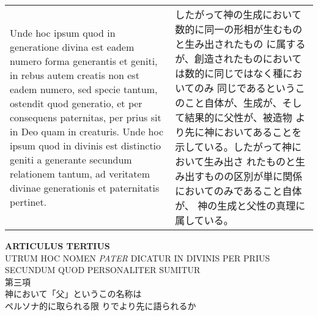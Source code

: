 \documentclass[10pt]{jsarticle} %
\begin{document}
\begin{longtable}{p{21em}p{21em}}
\\

Unde hoc ipsum quod in
generatione divina est eadem numero forma generantis et geniti, in
rebus autem creatis non est eadem numero, sed specie tantum, ostendit
quod generatio, et per consequens paternitas, per prius sit in Deo
quam in creaturis. Unde hoc ipsum quod in divinis est distinctio
geniti a generante secundum relationem tantum, ad veritatem divinae
generationis et paternitatis pertinet.

&

したがって神の生成において数的に同一の形相が生むものと生み出されたもの
 に属するが、創造されたものにおいては数的に同じではなく種においてのみ
 同じであるというこのこと自体が、生成が、そして結果的に父性が、被造物
 より先に神においてあることを示している。したがって神において生み出さ
 れたものと生み出すものの区別が単に関係においてのみであること自体が、
 神の生成と父性の真理に属している。


\end{longtable}
\newpage


\begin{center}
{\Large {\bf ARTICULUS TERTIUS}}\\
{\large UTRUM HOC NOMEN {\itshape PATER} DICATUR IN DIVINIS PER
 PRIUS\\SECUNDUM QUOD PERSONALITER SUMITUR}\\
{\Large 第三項 \\神において「父」というこの名称は\\ペルソナ的に取られる限
 りでより先に語られるか}
\end{center}
\end{document}
